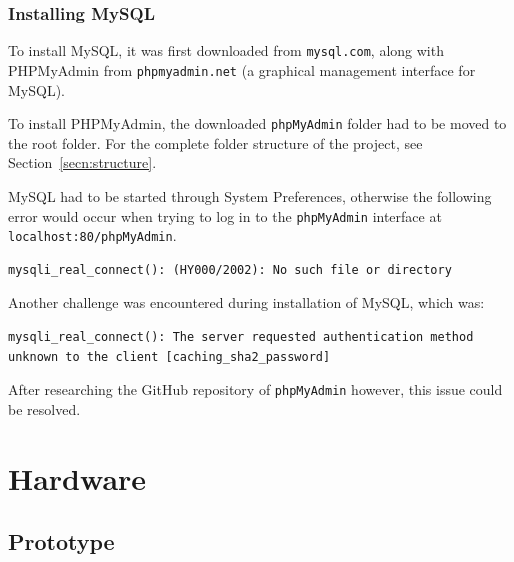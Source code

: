 \documentclass[12pt,openany,a4paper]{book}
\newcommand{\secn}[1] {Section~\ref{#1}}	%
\begin{document}
\subsubsection{Installing MySQL}

To install MySQL, it was first downloaded from \verb|mysql.com|, along with
PHPMyAdmin from \verb|phpmyadmin.net| (a graphical management interface for MySQL).

To install PHPMyAdmin, the downloaded \verb|phpMyAdmin| folder had to be moved
to the root folder. For the complete folder structure of the project, see \secn{secn:structure}.

MySQL had to be started through System Preferences, otherwise the following error
would occur when trying to log in to the \verb|phpMyAdmin| interface at \verb|localhost:80/phpMyAdmin|.

\begin{lstlisting}[basicstyle=\ttfamily,breaklines=true]
mysqli_real_connect(): (HY000/2002): No such file or directory
\end{lstlisting}

Another challenge was encountered during installation of MySQL, which was:

\begin{lstlisting}[basicstyle=\ttfamily,breaklines=true]
mysqli_real_connect(): The server requested authentication method unknown to the client [caching_sha2_password]
\end{lstlisting}

After researching the GitHub repository of \verb|phpMyAdmin| however, this issue
could be resolved.



\section{Hardware}

\subsection{Prototype}
\label{secn:prototype}
\end{document}
